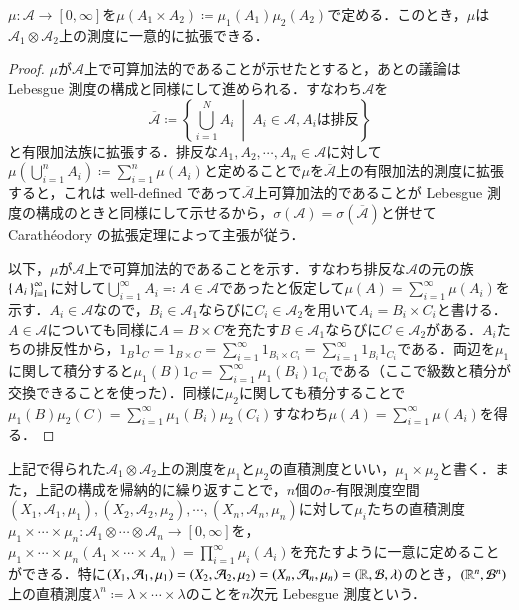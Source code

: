 \begin{thm}
$\mu \colon \mathcal{A} \to [0,\infty]$を$\mu(A_1 \times A_2) \coloneqq \mu_1(A_1) \mu_2(A_2)$で定める．このとき，$\mu$は$\mathcal{A}_1 \otimes \mathcal{A}_2$上の測度に一意的に拡張できる．
\end{thm}
\begin{proof}
$\mu$が$\mathcal{A}$上で可算加法的であることが示せたとすると，あとの議論は Lebesgue 測度の構成と同様にして進められる．すなわち$\mathcal{A}$を
\begin{equation}
\overline{\mathcal{A}} \coloneqq \left\{ \bigcup_{i=1}^N A_i \ \middle| \ A_i \in \mathcal{A}, A_i \text{は排反} \right\}
\end{equation}と有限加法族に拡張する．排反な$A_1, A_2, \cdots, A_n \in \mathcal{A}$に対して$\mu\left(\bigcup_{i=1}^n A_i\right) \coloneqq \sum_{i=1}^n \mu(A_i)$と定めることで$\mu$を$\overline{\mathcal{A}}$上の有限加法的測度に拡張すると，これは well-defined であって$\overline{\mathcal{A}}$上可算加法的であることが Lebesgue 測度の構成のときと同様にして示せるから，$\sigma(\mathcal{A}) = \sigma\left(\overline{\mathcal{A}}\right)$と併せて Carath\'eodory の拡張定理によって主張が従う．

以下，$\mu$が$\mathcal{A}$上で可算加法的であることを示す．すなわち排反な$\mathcal{A}$の元の族$\set{A_i}_{i=1}^\infty$に対して$\bigcup_{i=1}^\infty A_i \eqqcolon A \in \mathcal{A}$であったと仮定して$\mu(A) = \sum_{i=1}^\infty \mu(A_i)$を示す．$A_i \in \mathcal{A}$なので，$B_i \in \mathcal{A}_1$ならびに$C_i \in \mathcal{A}_2$を用いて$A_i = B_i \times C_i$と書ける．$A \in \mathcal{A}$についても同様に$A = B \times C$を充たす$B \in \mathcal{A}_1$ならびに$C \in \mathcal{A}_2$がある．$A_i$たちの排反性から，$1_B1_C=1_{B \times C} = \sum_{i=1}^\infty 1_{B_i \times C_i} = \sum_{i=1}^\infty 1_{B_i} 1_{C_i}$である．両辺を$\mu_1$に関して積分すると$\mu_1(B)1_C = \sum_{i=1}^\infty \mu_1(B_i) 1_{C_i}$である（ここで級数と積分が交換できることを使った）．同様に$\mu_2$に関しても積分することで$\mu_1(B)\mu_2(C) = \sum_{i=1}^\infty \mu_1(B_i) \mu_2(C_i)$すなわち$\mu(A) =  \sum_{i=1}^\infty \mu(A_i)$を得る．
\end{proof}

\begin{defi}
上記で得られた$\mathcal{A}_1 \otimes \mathcal{A}_2$上の測度を$\mu_1$と$\mu_2$の直積測度といい，$\mu_1 \times \mu_2$と書く．また，上記の構成を帰納的に繰り返すことで，$n$個の$\sigma$-有限測度空間$(X_1, \mathcal{A}_1, \mu_1), (X_2, \mathcal{A}_2, \mu_2), \cdots, (X_n, \mathcal{A}_n, \mu_n)$に対して$\mu_i$たちの直積測度$\mu_1 \times \cdots \times \mu_n \colon \mathcal{A}_1 \otimes \cdots \otimes \mathcal{A}_n \to [0, \infty]$を，$\mu_1 \times \cdots \times \mu_n (A_1 \times \cdots \times A_n) = \prod_{i=1}^\infty \mu_i(A_i)$を充たすように一意に定めることができる．特に$(X_1, \mathcal{A}_1, \mu_1) = (X_2, \mathcal{A}_2, \mu_2) = (X_n, \mathcal{A}_n, \mu_n) = (\mathbb{R}, \mathcal{B}, \lambda)$のとき，$(\mathbb{R}^n, \mathcal{B}^n)$上の直積測度$\lambda^n \coloneqq \lambda \times \cdots \times \lambda$のことを$n$次元 Lebesgue 測度という．
\end{defi}


